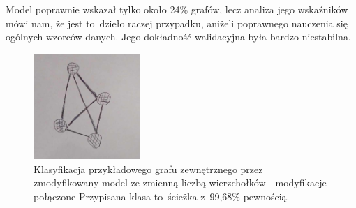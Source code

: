 Model poprawnie wskazał tylko około 24\% grafów, lecz analiza jego wskaźników mówi nam,
że jest to~dzieło raczej przypadku, aniżeli poprawnego nauczenia się ogólnych wzorców danych.
Jego dokładność walidacyjna była bardzo niestabilna.

\begin{figure}[ht]
	\centering
	\includegraphics[height=4cm]{../graph_classification/test_graphs/drawn/full-3.png}
	\caption{Klasyfikacja przykładowego grafu zewnętrznego przez zmodyfikowany model ze zmienną liczbą wierzchołków - modyfikacje połączone
		Przypisana klasa to~ścieżka z~99,68\% pewnością.}
	\label{Fig:tests-cv-2d}
\end{figure}
\FloatBarrier